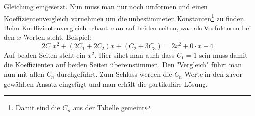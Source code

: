 \documentclass[a4paper,10pt]{scrartcl}
\begin{document}
        Gleichung eingesetzt. Nun muss man nur noch umformen und einen Koeffizientenvergleich vornehmen um die unbestimmeten Konstanten\footnote{Damit sind die \(C_n\) aus der Tabelle gemeint} zu finden. \\
        Beim Koeffizientenvergleich schaut man auf beiden seiten, was als Vorfaktoren bei den \(x\)-Werten steht. Beispiel: 
        \begin{equation*}
            2C_1x^2 + (2C_1 + 2C_2)x + (C_2+ 3C_3) = 2x^2 + 0 \cdot x - 4 
        \end{equation*}
        Auf beiden Seiten steht ein \(x^2\). Hier sihet man auch dass \(C_1 = 1\) sein muss damit die Koeffizienten auf beiden Seiten übereinstimmen. Den "Vergleich" führt man 
        nun mit allen \(C_n\) durchgeführt. Zum Schluss werden die \(C_n\)-Werte in den zuvor gewählten Ansatz eingefügt und man erhält die partikuläre Lösung.  
\end{document}
